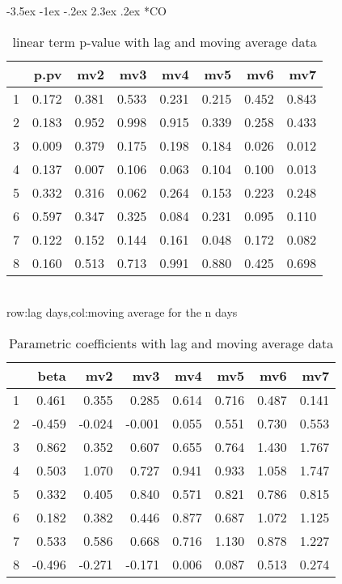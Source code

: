 \documentclass[a4paper, 12pt]{article}
\makeatletter
\def\large{\fontsize{14}{20}\selectfont}
\renewcommand\subsection{\@startsection {subsection}{1}{\z@}%
                                   {-3.5ex \@plus -1ex \@minus -.2ex}%
                                   {2.3ex \@plus.2ex}%
                                   {\centering\normalfont\large\bfseries}}
\makeatother
\begin{document}
\subsection*{CO}
\begin{table}[h]
\centering
\caption{linear term p-value with lag and moving average data}
\begin{tabular}{rrrrrrrr}
  \hline
 & p.pv & mv2 & mv3 & mv4 & mv5 & mv6 & mv7 \\
  \hline
1 & 0.172 & 0.381 & 0.533 & 0.231 & 0.215 & 0.452 & 0.843 \\
  2 & 0.183 & 0.952 & 0.998 & 0.915 & 0.339 & 0.258 & 0.433 \\
  3 & 0.009 & 0.379 & 0.175 & 0.198 & 0.184 & 0.026 & 0.012 \\
  4 & 0.137 & 0.007 & 0.106 & 0.063 & 0.104 & 0.100 & 0.013 \\
  5 & 0.332 & 0.316 & 0.062 & 0.264 & 0.153 & 0.223 & 0.248 \\
  6 & 0.597 & 0.347 & 0.325 & 0.084 & 0.231 & 0.095 & 0.110 \\
  7 & 0.122 & 0.152 & 0.144 & 0.161 & 0.048 & 0.172 & 0.082 \\
  8 & 0.160 & 0.513 & 0.713 & 0.991 & 0.880 & 0.425 & 0.698 \\
   \hline
\end{tabular}
\\row:lag days,col:moving average for the n days
\end{table}
\begin{table}[h]
\centering
\caption{Parametric coefficients with lag and moving average data}
\begin{tabular}{rrrrrrrr}
  \hline
 & beta & mv2 & mv3 & mv4 & mv5 & mv6 & mv7 \\
  \hline
1 & 0.461 & 0.355 & 0.285 & 0.614 & 0.716 & 0.487 & 0.141 \\
  2 & -0.459 & -0.024 & -0.001 & 0.055 & 0.551 & 0.730 & 0.553 \\
  3 & 0.862 & 0.352 & 0.607 & 0.655 & 0.764 & 1.430 & 1.767 \\
  4 & 0.503 & 1.070 & 0.727 & 0.941 & 0.933 & 1.058 & 1.747 \\
  5 & 0.332 & 0.405 & 0.840 & 0.571 & 0.821 & 0.786 & 0.815 \\
  6 & 0.182 & 0.382 & 0.446 & 0.877 & 0.687 & 1.072 & 1.125 \\
  7 & 0.533 & 0.586 & 0.668 & 0.716 & 1.130 & 0.878 & 1.227 \\
  8 & -0.496 & -0.271 & -0.171 & 0.006 & 0.087 & 0.513 & 0.274 \\
   \hline
\end{tabular}
\end{table}
\clearpage
\end{document}
